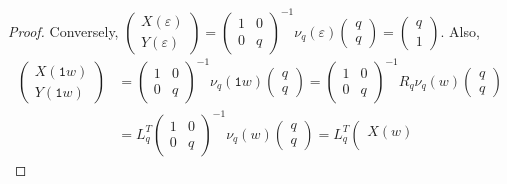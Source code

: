 \documentclass[a4paper,12pt]{amsart}
\newcommand{\0}{\mathtt{0}}
\newcommand{\1}{\mathtt{1}}
\newcommand{\2}{\mathtt{2}}
\newcommand{\3}{\mathtt{3}}
\begin{document}
\begin{proof}
    Conversely,
    $
        \left(\begin{smallmatrix}
            X(\varepsilon)\\
            Y(\varepsilon)
        \end{smallmatrix}\right)
        =
        \left(\begin{smallmatrix} 1 & 0 \\ 0 & q \end{smallmatrix}\right)^{-1}
        \nu_q(\varepsilon)
        \left(\begin{smallmatrix} q \\ q \end{smallmatrix}\right)
        =
        \left(\begin{smallmatrix} q \\ 1 \end{smallmatrix}\right)
    $.
    Also,
    \begin{align*}
        \left(\begin{array}{r}
            X(\1 w)\\
            Y(\1 w)
        \end{array}\right)
        &=
        \left(\begin{smallmatrix} 1 & 0 \\ 0 & q \end{smallmatrix}\right)^{-1}
        \nu_q(\1w)
        \left(\begin{smallmatrix} q \\ q \end{smallmatrix}\right)
        =
        \left(\begin{smallmatrix} 1 & 0 \\ 0 & q \end{smallmatrix}\right)^{-1}
        R_q
        \nu_q(w)
        \left(\begin{smallmatrix} q \\ q \end{smallmatrix}\right)\\
        &=
        L_q^T
        \left(\begin{smallmatrix} 1 & 0 \\ 0 & q \end{smallmatrix}\right)^{-1}
        \nu_q(w)
        \left(\begin{smallmatrix} q \\ q \end{smallmatrix}\right)
        =
        L_q^T
        \left(\begin{array}{c}
            X(w)\\

\end{array}
\end{align*}
\end{proof}
\end{document}
